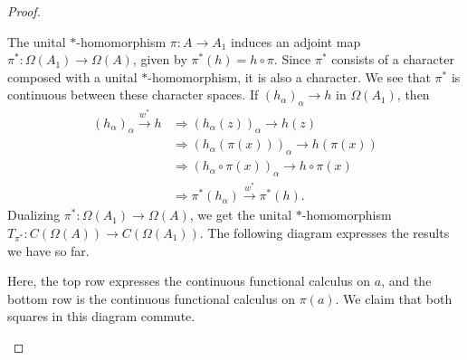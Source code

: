 \documentclass[10pt]{mypackage}
\begin{document}
\begin{proof}
\begin{enumerate}[(1)]
      The unital $\ast$-homomorphism $\pi\colon A\rightarrow A_1$ induces an adjoint map $\pi^{\ast}\colon \Omega\left(A_1\right)\rightarrow \Omega\left(A\right)$, given by $\pi^{\ast}\left(h\right) = h\circ \pi$. Since $\pi^{\ast}$ consists of a character composed with a unital $\ast$-homomorphism, it is also a character. We see that $\pi^{\ast}$ is continuous between these character spaces. If $\left(h_{\alpha}\right)_{\alpha}\rightarrow h$ in $\Omega\left(A_1\right)$, then
      \begin{align*}
        \left(h_{\alpha}\right)_{\alpha}\xrightarrow{w^{\ast}}h &\Rightarrow \left(h_{\alpha}\left(z\right)\right)_{\alpha}\rightarrow h\left(z\right)\tag*{$z\in A_1$}\\
                                                                &\Rightarrow \left(h_{\alpha}\left(\pi\left(x\right)\right)\right)_{\alpha}\rightarrow h\left(\pi\left(x\right)\right) \tag*{$x\in A$}\\
                                                                &\Rightarrow \left(h_{\alpha}\circ\pi\left(x\right)\right)_{\alpha} \rightarrow h\circ\pi \left(x\right)\\
                                                                &\Rightarrow \pi^{\ast}\left(h_{\alpha}\right)\xrightarrow{w^{\ast}} \pi^{\ast}\left(h\right).
      \end{align*}
      Dualizing $\pi^{\ast}\colon \Omega\left(A_1\right)\rightarrow \Omega\left(A\right)$, we get the unital $\ast$-homomorphism $T_{\pi^{\ast}}\colon C\left(\Omega\left(A\right)\right)\rightarrow C\left(\Omega\left(A_1\right)\right)$. The following diagram expresses the results we have so far.
      \begin{center}
      \end{center}
      Here, the top row expresses the continuous functional calculus on $a$, and the bottom row is the continuous functional calculus on $\pi(a)$. We claim that both squares in this diagram commute.\newline


\end{enumerate}
\end{proof}
\end{document}
